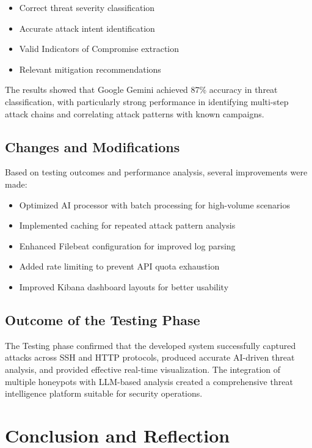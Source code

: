 \documentclass[12pt,a4paper]{report}
\begin{document}
\begin{itemize}
\item Correct threat severity classification
\item Accurate attack intent identification
\item Valid Indicators of Compromise extraction
\item Relevant mitigation recommendations
\end{itemize}

The results showed that Google Gemini achieved 87\% accuracy in threat classification, with particularly strong performance in identifying multi-step attack chains and correlating attack patterns with known campaigns.

\section{Changes and Modifications}

Based on testing outcomes and performance analysis, several improvements were made:

\begin{itemize}
\item Optimized AI processor with batch processing for high-volume scenarios
\item Implemented caching for repeated attack pattern analysis
\item Enhanced Filebeat configuration for improved log parsing
\item Added rate limiting to prevent API quota exhaustion
\item Improved Kibana dashboard layouts for better usability
\end{itemize}

\section{Outcome of the Testing Phase}

The Testing phase confirmed that the developed system successfully captured attacks across SSH and HTTP protocols, produced accurate AI-driven threat analysis, and provided effective real-time visualization. The integration of multiple honeypots with LLM-based analysis created a comprehensive threat intelligence platform suitable for security operations.


\chapter{Conclusion and Reflection}
\thispagestyle{fancy}
\end{document}
